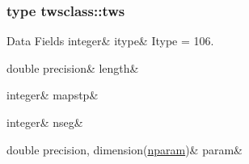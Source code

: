 \subsubsection{type twsclass\+::tws}
\begin{DoxyFields}{Data Fields}
\mbox{\label{namespacetwsclass_a2dcf113402de09fb0cbb7a7779dd11f2}} 
integer&
itype&
Itype = 106. \\
\hline

\mbox{\label{namespacetwsclass_a21f6cc9104c13b52b03da5b9e283f07b}} 
double precision&
length&
\\
\hline

\mbox{\label{namespacetwsclass_a023933666722b8509103d43f82f3c251}} 
integer&
mapstp&
\\
\hline

\mbox{\label{namespacetwsclass_a9977eae9217b979dc25554e7f3453339}} 
integer&
nseg&
\\
\hline

\mbox{\label{namespacetwsclass_ada2bbea749395b11dbf0f9d8b27b5fcf}} 
double precision, dimension(\mbox{\hyperlink{namespacetwsclass_ae92106a92b2952cbb34ae48df4c6b375}{nparam}})&
param&
\\
\hline

\end{DoxyFields}
